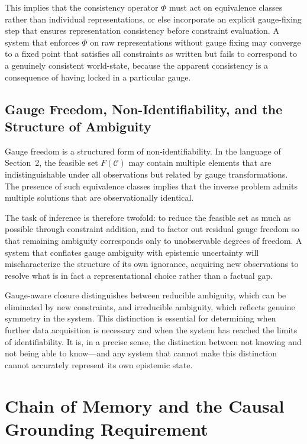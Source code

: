 \documentclass[12pt, oneside]{article}
\begin{document}
This implies that the consistency operator $\Phi$ must act on equivalence classes rather than individual representations, or else incorporate an explicit gauge-fixing step that ensures representation consistency before constraint evaluation. A system that enforces $\Phi$ on raw representations without gauge fixing may converge to a fixed point that satisfies all constraints as written but fails to correspond to a genuinely consistent world-state, because the apparent consistency is a consequence of having locked in a particular gauge.

\subsection{Gauge Freedom, Non-Identifiability, and the Structure of Ambiguity}

Gauge freedom is a structured form of non-identifiability. In the language of Section~2, the feasible set $F(\mathcal{C})$ may contain multiple elements that are indistinguishable under all observations but related by gauge transformations. The presence of such equivalence classes implies that the inverse problem admits multiple solutions that are observationally identical.

The task of inference is therefore twofold: to reduce the feasible set as much as possible through constraint addition, and to factor out residual gauge freedom so that remaining ambiguity corresponds only to unobservable degrees of freedom. A system that conflates gauge ambiguity with epistemic uncertainty will mischaracterize the structure of its own ignorance, acquiring new observations to resolve what is in fact a representational choice rather than a factual gap.

Gauge-aware closure distinguishes between reducible ambiguity, which can be eliminated by new constraints, and irreducible ambiguity, which reflects genuine symmetry in the system. This distinction is essential for determining when further data acquisition is necessary and when the system has reached the limits of identifiability. It is, in a precise sense, the distinction between not knowing and not being able to know---and any system that cannot make this distinction cannot accurately represent its own epistemic state.

\section{Chain of Memory and the Causal Grounding Requirement}
\end{document}
